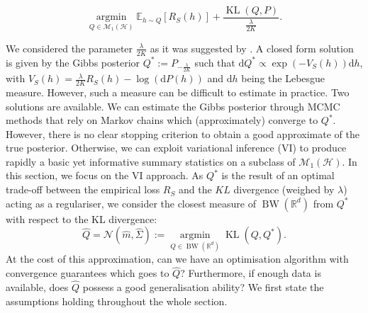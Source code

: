 \[ \underset{Q\in \mathcal{M}_1(\mathcal{H})}{\operatorname{argmin}} \mathbb{E}_{h\sim Q}[R_S(h)] + \frac{\operatorname{KL}(Q,P)}{\frac{\lambda}{2K}}.  \]

\noindent We considered the parameter $\frac{\lambda}{2K}$ as it was suggested by .
A closed form solution is given by the Gibbs posterior $Q^*:= P_{-\frac{\lambda}{2K}}$ such that $\mathrm{d}Q^* \propto \exp(-V_S(h))\mathrm{d}h$, with $V_S(h) = \frac{\lambda}{2K}R_S(h) - \log(\mathrm{d}P(h))$ and $\mathrm{d}h$ being the Lebesgue measure.
However, such a measure can be difficult to estimate in practice. Two solutions are available. We can estimate the Gibbs posterior through MCMC methods that rely on Markov chains which (approximately) converge to $Q^*$. However, there is no clear stopping criterion to obtain a good approximate of the true posterior. Otherwise, we can exploit variational inference (VI) to produce rapidly a basic yet informative summary statistics on a subclass of $\mathcal{M}_1(\mathcal{H})$.
In this section, we focus on the VI approach. As $Q^*$ is the result of an optimal trade-off between the empirical loss $R_S$ and the $KL$ divergence (weighed by $\lambda$) acting as a regulariser, we consider the closest measure of $\operatorname{BW}(\mathbb{R}^d)$ from $Q^*$ with respect to the KL divergence:
\[ \hat{Q} = \mathcal{N}(\hat{m},\hat{\Sigma}) := \underset{Q\in \operatorname{BW}(\mathbb{R}^d)}{\operatorname{argmin}} \operatorname{KL}(Q,Q^*). \]
At the cost of this approximation, can we have an optimisation algorithm with convergence guarantees which goes to $\hat{Q}$? Furthermore, if enough data is available, does $\hat{Q}$ possess a good generalisation ability?
We first state the assumptions holding throughout the whole section.

